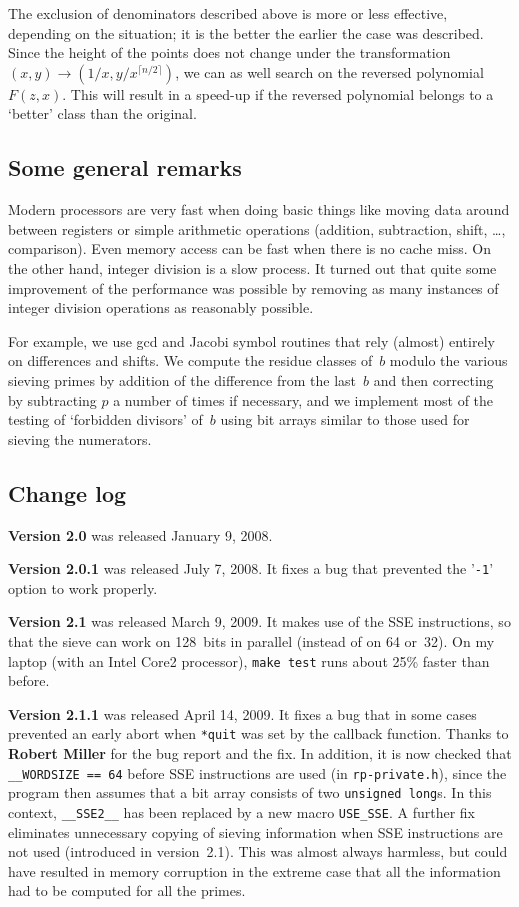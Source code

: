 \documentclass[12pt,a4paper,oneside]{amsart}
\begin{document}
The exclusion of denominators described above is more or less effective,
depending on the situation; it is the better the earlier the case was
described. Since the height of the points does not change under the
transformation $(x,y) \to (1/x, y/x^{\lceil n/2 \rceil})$, we can as well search on the
reversed polynomial $F(z,x)$. This will result in a speed-up if the
reversed polynomial belongs to a `better' class than the original.

\subsection{Some general remarks}

Modern processors are very fast when doing basic things like moving
data around between registers or simple arithmetic operations (addition,
subtraction, shift, \dots, comparison). Even memory access can be fast
when there is no cache miss. On the other hand, integer division is a
slow process. It turned out that quite some improvement of the performance
was possible by removing as many instances of integer division operations
as reasonably possible.

For example, we use gcd and Jacobi symbol routines that rely (almost)
entirely on differences and shifts. We compute the residue classes
of~$b$ modulo the various sieving primes by addition of the difference
from the last~$b$ and then correcting by subtracting $p$ a number of
times if necessary, and we implement most of the testing of `forbidden
divisors' of~$b$ using bit arrays similar to those used for sieving
the numerators.

\subsection{Change log}

\textbf{Version 2.0} was released January 9, 2008.

\textbf{Version 2.0.1} was released July 7, 2008. It fixes a bug that prevented the
'\texttt{-1}' option to work properly.

\textbf{Version 2.1} was released March 9, 2009. It makes use of the SSE instructions,
so that the sieve can work on 128~bits in parallel (instead of on 64 or~32).
On my laptop (with an Intel Core2 processor), \texttt{make test} runs about
25\% faster than before.

\textbf{Version 2.1.1} was released April 14, 2009. It fixes a bug that in some
cases prevented an early abort when \texttt{*quit} was set by the callback function.
Thanks to \textbf{Robert Miller} for the bug report and the fix. In addition, it is now
checked that \verb+__WORDSIZE == 64+ before SSE instructions are used
(in \texttt{rp-private.h}), since the program then assumes that a bit array consists
of two \texttt{unsigned long}s. In this context, \verb+__SSE2__+ has been replaced
by a new macro \verb+USE_SSE+. A further fix eliminates unnecessary copying
of sieving information when SSE instructions are not used (introduced in version~2.1).
This was almost always harmless, but could have resulted in memory corruption
in the extreme case that all the information had to be computed for all the
primes.
\end{document}
